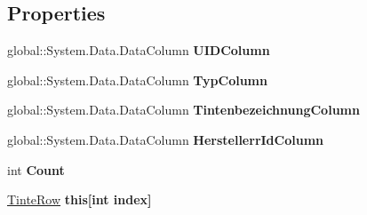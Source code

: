 \subsection*{Properties}
\begin{DoxyCompactItemize}
\item 
global\+::\+System.\+Data.\+Data\+Column {\bfseries U\+I\+D\+Column}\hypertarget{class_products_1_1_data_1_1ds_sage_1_1_tinte_data_table_af83c3b32e72c0ea18adc831496d71e9f}{}\label{class_products_1_1_data_1_1ds_sage_1_1_tinte_data_table_af83c3b32e72c0ea18adc831496d71e9f}

\item 
global\+::\+System.\+Data.\+Data\+Column {\bfseries Typ\+Column}\hypertarget{class_products_1_1_data_1_1ds_sage_1_1_tinte_data_table_ae332d0a15f87fc064706149e09735269}{}\label{class_products_1_1_data_1_1ds_sage_1_1_tinte_data_table_ae332d0a15f87fc064706149e09735269}

\item 
global\+::\+System.\+Data.\+Data\+Column {\bfseries Tintenbezeichnung\+Column}\hypertarget{class_products_1_1_data_1_1ds_sage_1_1_tinte_data_table_a3f2c66f787bdb055cfcd817fd9af5777}{}\label{class_products_1_1_data_1_1ds_sage_1_1_tinte_data_table_a3f2c66f787bdb055cfcd817fd9af5777}

\item 
global\+::\+System.\+Data.\+Data\+Column {\bfseries Herstellerr\+Id\+Column}\hypertarget{class_products_1_1_data_1_1ds_sage_1_1_tinte_data_table_a61a7665b686c79ff2fcc3b08878d2588}{}\label{class_products_1_1_data_1_1ds_sage_1_1_tinte_data_table_a61a7665b686c79ff2fcc3b08878d2588}

\item 
int {\bfseries Count}\hypertarget{class_products_1_1_data_1_1ds_sage_1_1_tinte_data_table_aca1dd44c427cd66aca7d18b641dbbfe7}{}\label{class_products_1_1_data_1_1ds_sage_1_1_tinte_data_table_aca1dd44c427cd66aca7d18b641dbbfe7}

\item 
\hyperlink{class_products_1_1_data_1_1ds_sage_1_1_tinte_row}{Tinte\+Row} {\bfseries this\mbox{[}int index\mbox{]}}\hypertarget{class_products_1_1_data_1_1ds_sage_1_1_tinte_data_table_a7df0c7ecfd9f1154e10193ab40ed2be7}{}\label{class_products_1_1_data_1_1ds_sage_1_1_tinte_data_table_a7df0c7ecfd9f1154e10193ab40ed2be7}

\end{DoxyCompactItemize}
